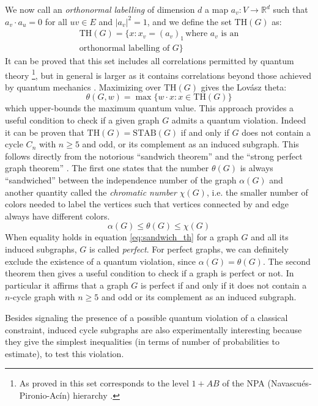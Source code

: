 \documentclass[letterpaper]{article}
\newcommand{\Real}{\mathbb{R}}
\newcommand{\STAB}{\mathrm{STAB}}
\renewcommand{\TH}{\mathrm{TH}}
\begin{document}
We now call an \emph{orthonormal labelling} of dimension $d$ a map
$a_v:V \rightarrow \Real^d$ such that $a_v \cdot a_u = 0$ for all $uv \in E$ and
$|a_v|^2 = 1$, and we define the set $\TH(G)$ as:
\begin{multline}
    \TH(G) = \{x: x_v = (a_v)_1 \, \text{where $a_v$ is an} \\ \text{orthonormal labelling of $G$}\}
    \label{eq:thbody}
\end{multline}
It can be proved that this set includes all correlations permitted by quantum
theory \footnote{As proved in \cite{acin2015} this set corresponds to the level
$1+AB$ of the NPA (Navascués-Pironio-Acín) hierarchy \cite{npa2008}.}, 
but in general is larger as it contains correlations beyond those achieved by quantum
mechanics \cite{almostquantum2015}.
Maximizing over $\TH(G)$ gives the Lovász theta:
\begin{equation}
    \theta(G,w) = \max \{w\cdot x : x \in \TH(G)\}
    \label{eq:lovasztheta}
\end{equation}
which upper-bounds the maximum quantum value.
This approach provides a useful condition to check if a given graph $G$ admits a
quantum violation. Indeed it can be proven that $\TH(G) = \STAB(G)$ if and only
if $G$ does not contain a cycle $C_n$ with $n \ge 5$ and odd, or its complement
as an induced subgraph. 
This follows directly from the notorious ``sandwich theorem''\cite{knuth,lovasz} and the ``strong
perfect graph theorem'' \cite{spgth}.
The first one states that the number $\theta(G)$ is always ``sandwiched''
between the independence number of the graph $\alpha(G)$ and another quantity
called the \emph{chromatic number} $\chi(G)$, i.e. the smaller number of colors needed
to label the vertices such that vertices connected by and edge always have
different colors.
\begin{equation}
    \alpha(G) \le \theta(G) \le \chi(G)
    \label{eq:sandwich_th}
\end{equation}
When equality holds in equation \eqref{eq:sandwich_th} for a graph $G$ and all its
induced subgraphs, $G$ is called \emph{perfect}.
For perfect graphs, we can definitely exclude the existence of a quantum
violation, since $\alpha(G) = \theta(G)$.
The second theorem then gives a useful condition to check if a graph is perfect
or not.  In particular it affirms that a graph $G$ is perfect if and only if it
does not contain a $n$-cycle graph with $n\ge5$ and odd or its complement as an
induced subgraph.

Besides signaling the presence of a possible quantum violation of a classical
constraint, induced cycle subgraphs are also experimentally interesting because
they give the simplest inequalities (in terms of number of probabilities to
estimate), to test this violation.
\end{document}
